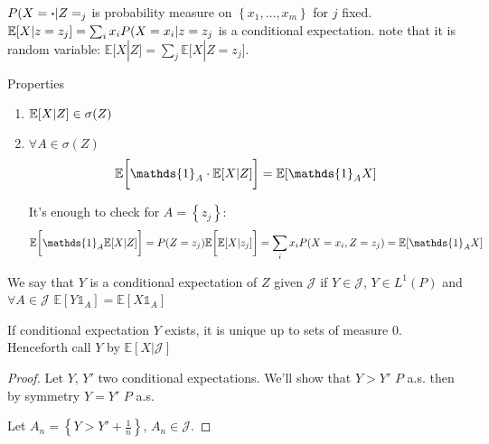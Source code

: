 
$P(X=\vdot|Z=_j$ is probability measure on $\left\{ x_1, \dots, x_m \right\}$ for $j$ fixed. $\mathbb{E}\qty[X|z=z_j] = \sum_i x_i P(X=x_i|z=z_j$ is a conditional expectation. note that it is random variable: $\mathbb{E}[X|Z] = \sum_j \mathbb{E}[X|Z=z_j$]. 

Properties
\begin{enumerate}
\item $\mathbb{E}\qty[X|Z] \in \sigma(Z)$
\item $\forall A \in \sigma(Z)$
$$\mathbb{E}\qty\bigg[\mathds{1}_A \cdot \mathbb{E}[X|Z] ] = \mathbb{E}\qty[\mathds{1}_A X]$$

It's enough to check for $A=\left\{ z_j \right\}$:
$$\mathbb{E}\qty\bigg[\mathds{1}_A \mathbb{E}[X|Z]] =  P(Z=z_j)\mathbb{E}\qty\bigg[\mathbb{E}[X|z_j]] =  \sum_i x_i P(X=x_i, Z=z_j) = \mathbb{E}\qty[\mathds{1}_A X]$$


\end{enumerate}
\begin{definition} 
We say that $Y$ is a conditional expectation of $Z$ given $\mathcal{J}$ if $Y\in\mathcal{J}$, $Y\in L^1(P)$ and $\forall A \in \mathcal{J}$ $\mathbb{E}[Y\mathds{1}_A] = \mathbb{E}[X\mathds{1}_A]$
\end{definition}

\begin{lemma}
If conditional expectation $Y$ exists, it is unique up to sets of measure $0$. Henceforth call $Y$ by $\mathbb{E}[X|\mathcal{J}]$
\begin{proof}
Let $Y$, $Y'$ two conditional expectations. We'll show that $Y>Y'$ $P$ a.s. then by symmetry $Y=Y'$ $P$ a.s.

Let $A_n = \left\{ Y>Y' + \frac{1}{n} \right\}$, $A_n \in \mathcal{J}$.
\end{proof}
\end{lemma}


